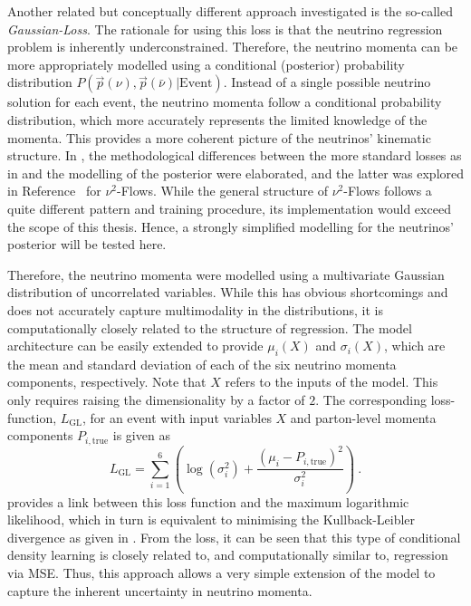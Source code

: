 Another related but conceptually different approach investigated is the so-called \textit{Gaussian-Loss}. The rationale for using this loss is that the neutrino regression problem is inherently underconstrained.
Therefore, the neutrino momenta can be more appropriately modelled using a conditional (posterior) probability distribution $P(\vec p(\nu),\vec p(\bar{\nu})|\text{Event})$. Instead of a single possible neutrino solution for each event, the neutrino momenta follow a conditional probability distribution, which more accurately represents the limited knowledge of the momenta. This provides a more coherent picture of the neutrinos' kinematic structure. In , the methodological differences between the more standard losses as in  and the modelling of the posterior were elaborated, and the latter was explored in Reference~\cite{nu_square_flows} for $\nu^2$-Flows. While the general structure of $\nu^2$-Flows follows a quite different pattern and training procedure, its implementation would exceed the scope of this thesis. Hence, a strongly simplified modelling for the neutrinos' posterior will be tested here.

Therefore, the neutrino momenta were modelled using a multivariate Gaussian distribution of uncorrelated variables. While this has obvious shortcomings and does not accurately capture multimodality in the distributions, it is computationally closely related to the structure of regression. The model architecture can be easily extended to provide $\mu_i(X)$ and $\sigma_i(X)$, which are the mean and standard deviation of each of the six neutrino momenta components, respectively. Note that $X$ refers to the inputs of the model. This only requires raising the dimensionality by a factor of $2$. The corresponding loss-function, $L_{\text{GL}}$, for an event with input variables $X$ and parton-level momenta components $P_{i,\text{true}}$ is given as 
\begin{equation}
    L_{\text{GL}}=\sum_{i=1}^6\left(\log(\sigma^2_i)+\frac{(\mu_i-P_{i,\text{true}})^2}{\sigma^2_i}\right)~.
\end{equation}
 provides a link between this loss function and the maximum logarithmic likelihood, which in turn is equivalent to minimising the Kullback-Leibler divergence as given in .
From the loss, it can be seen that this type of conditional density learning is closely related to, and computationally similar to, regression via MSE. Thus, this approach allows a very simple extension of the model to capture the inherent uncertainty in neutrino momenta. 

